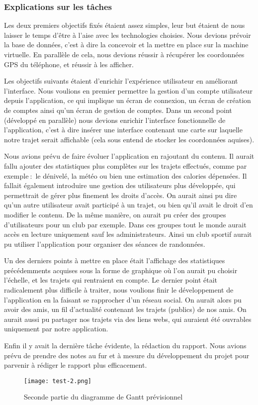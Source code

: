 \subsubsection{Explications sur les tâches}
Les deux premiers objectifs fixés étaient assez simples, leur but étaient de nous laisser le temps d'être à l'aise avec les technologies choisies.
Nous devions prévoir la base de données, c'est à dire la concevoir et la mettre en place sur la machine virtuelle. En parallèle de cela, nous devions réussir à récupérer les coordonnées GPS du téléphone, et réussir à les afficher.
\par
Les objectifs suivants étaient d'enrichir l'expérience utilisateur en améliorant l'interface. Nous voulions en premier permettre la gestion d'un compte utilisateur depuis l'application, ce qui implique un écran de connexion, un écran de création de comptes ainsi qu'un écran de gestion de comptes.
Dans un second point (développé en parallèle) nous devions enrichir l'interface fonctionnelle de l'application, c'est à dire insérer une interface contenant une carte sur laquelle notre trajet serait affichable (cela sous entend de stocker les coordonnées aquises).
\par
Nous avions prévu de faire évoluer l'application en rajoutant du contenu. Il aurait fallu ajouter des statistiques plus complètes sur les trajets effectués, comme par exemple$\ :$ le dénivelé, la météo ou bien une estimation des calories dépensées.
Il fallait également introduire une gestion des utilisateurs plus développée, qui permettrait de gérer plus finement les droits d'accès. On aurait ainsi pu dire qu'un autre utilisateur avait participé à un trajet, ou bien qu'il avait le droit d'en modifier le contenu.
De la même manière, on aurait pu créer des groupes d'utilisateurs pour un club par exemple. Dans ces groupes tout le monde aurait accès en lecture uniquement sauf les administrateurs. Ainsi un club sportif aurait pu utiliser l'application pour organiser des séances de randonnées.
\par
Un des derniers points à mettre en place était l'affichage des statistiques précédemments acquises sous la forme de graphique où l'on aurait pu choisir l'échelle, et les trajets qui rentraient en compte.
Le dernier point était radicalement plus difficile à traiter, nous voulions finir le développement de l'application en la faisant se rapprocher d'un réseau social. On aurait alors pu avoir des amis, un fil d'actualité contenant les trajets (publics) de nos amis. On aurait aussi pu partager
nos trajets via des liens webs, qui auraient été ouvrables uniquement par notre application.
\par
Enfin il y avait la dernière tâche évidente, la rédaction du rapport. Nous avions prévu de prendre des notes au fur et à mesure du développement du projet pour parvenir à rédiger le rapport plus efficacement.
\vfill
\begin{figure}[!h]
    \begin{center}
        \texttt{[image: test-2.png]}
        \caption{Seconde partie du diagramme de Gantt prévisionnel}
    \end{center}
\end{figure}






